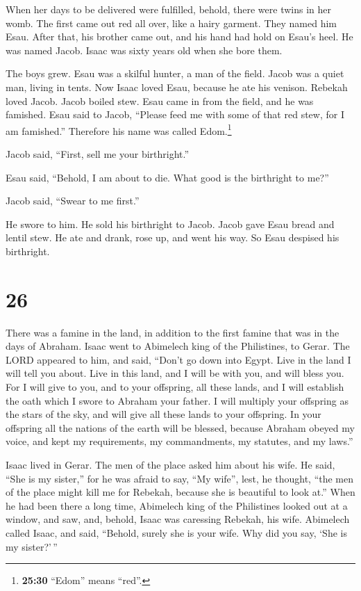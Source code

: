  When her days to be delivered were fulfilled, behold,
there were twins in her womb.  The first came out red all
over, like a hairy garment. They named him Esau.  After
that, his brother came out, and his hand had hold on Esau's heel. He was
named Jacob. Isaac was sixty years old when she bore them.

 The boys grew. Esau was a skilful hunter, a man of the
field. Jacob was a quiet man, living in tents.  Now Isaac
loved Esau, because he ate his venison. Rebekah loved Jacob.
 Jacob boiled stew. Esau came in from the field, and he
was famished.  Esau said to Jacob, ``Please feed me with
some of that red stew, for I am famished.'' Therefore his name was
called Edom.\footnote{\textbf{25:30} ``Edom'' means ``red''.}

 Jacob said, ``First, sell me your birthright.''

 Esau said, ``Behold, I am about to die. What good is the
birthright to me?''

 Jacob said, ``Swear to me first.''

He swore to him. He sold his birthright to Jacob.  Jacob
gave Esau bread and lentil stew. He ate and drank, rose up, and went his
way. So Esau despised his birthright.

\hypertarget{section-25}{%
\section{26}\label{section-25}}

 There was a famine in the land, in addition to the first
famine that was in the days of Abraham. Isaac went to Abimelech king of
the Philistines, to Gerar.  The LORD appeared to him, and
said, ``Don't go down into Egypt. Live in the land I will tell you
about.  Live in this land, and I will be with you, and
will bless you. For I will give to you, and to your offspring, all these
lands, and I will establish the oath which I swore to Abraham your
father.  I will multiply your offspring as the stars of
the sky, and will give all these lands to your offspring. In your
offspring all the nations of the earth will be blessed, 
because Abraham obeyed my voice, and kept my requirements, my
commandments, my statutes, and my laws.''

 Isaac lived in Gerar.  The men of the place
asked him about his wife. He said, ``She is my sister,'' for he was
afraid to say, ``My wife'', lest, he thought, ``the men of the place
might kill me for Rebekah, because she is beautiful to look at.''
 When he had been there a long time, Abimelech king of the
Philistines looked out at a window, and saw, and, behold, Isaac was
caressing Rebekah, his wife.  Abimelech called Isaac, and
said, ``Behold, surely she is your wife. Why did you say, `She is my
sister?'\,''

